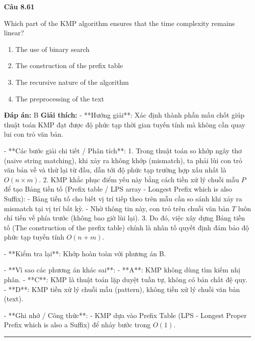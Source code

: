 \documentclass[11pt,a4paper]{article}
\newenvironment{question}[1]{%
  \par\vspace{1em}\noindent\textbf{\large Câu #1}\par\vspace{0.4em}
}{%
  \par\vspace{1em}\hrule\vspace{0.6em}
}
\newenvironment{choices}{%
  \begin{enumerate}[label=\textbf{\Alph*.},leftmargin=2.2em,itemsep=2pt,topsep=3pt]
}{%
  \end{enumerate}
}
\newcommand{\choice}{\item}
\begin{document}
\begin{question}{8.61}
Which part of the KMP algorithm ensures that the time complexity remains linear?
\begin{choices}
\choice The use of binary search
\choice The construction of the prefix table
\choice The recursive nature of the algorithm
\choice The preprocessing of the text
\end{choices}
\textbf{Đáp án:} B
\textbf{Giải thích:} - **Hướng giải**:
  Xác định thành phần mấu chốt giúp thuật toán KMP đạt được độ phức tạp thời gian tuyến tính mà không cần quay lui con trỏ văn bản.

- **Các bước giải chi tiết / Phân tích**:
  1. Trong thuật toán so khớp ngây thơ (naive string matching), khi xảy ra không khớp (mismatch), ta phải lùi con trỏ văn bản về và thử lại từ đầu, dẫn tới độ phức tạp trường hợp xấu nhất là \(O(n \times m)\).
  2. KMP khắc phục điểm yếu này bằng cách tiền xử lý chuỗi mẫu \(P\) để tạo Bảng tiền tố (Prefix table / LPS array - Longest Prefix which is also Suffix):
     - Bảng tiền tố cho biết vị trí tiếp theo trên mẫu cần so sánh khi xảy ra mismatch tại vị trí bất kỳ.
     - Nhờ thông tin này, con trỏ trên chuỗi văn bản \(T\) luôn chỉ tiến về phía trước (không bao giờ lùi lại).
  3. Do đó, việc xây dựng Bảng tiền tố (The construction of the prefix table) chính là nhân tố quyết định đảm bảo độ phức tạp tuyến tính \(O(n + m)\).

- **Kiểm tra lại**:
  Khớp hoàn toàn với phương án B.

- **Vì sao các phương án khác sai**:
  - **A**: KMP không dùng tìm kiếm nhị phân.
  - **C**: KMP là thuật toán lặp duyệt tuần tự, không có bản chất đệ quy.
  - **D**: KMP tiền xử lý chuỗi mẫu (pattern), không tiền xử lý chuỗi văn bản (text).

- **Ghi nhớ / Công thức**:
  - KMP dựa vào Prefix Table (LPS - Longest Proper Prefix which is also a Suffix) để nhảy bước trong \(O(1)\).
\end{question}
\end{document}
